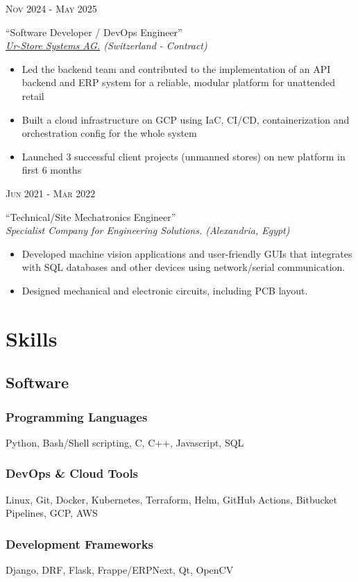 \documentclass[a4paper]{article}
\newcommand{\entry}[4]{   %
	\begin{center}
		\begin{minipage}[c]{0.2\linewidth}  %
			\vfill
			\hfill  %
			\textsc{#1}  %
			\vfill
		\end{minipage}
		\hfill\vline\hfill  %
		\begin{minipage}[c]{0.75\linewidth}
			\textrm{``#2''} \\
			\textit{#3} \\
			\footnotesize{#4}
		\end{minipage}
	\end{center}
}
\newcommand{\blist}[1]{  %
    \vspace{-\topsep}
    \renewcommand\labelitemi{\tiny$\bullet$}
    \begin{itemize}[leftmargin=3.5mm, noitemsep]
        #1
    \end{itemize}
}
\begin{document}
        \entry{Nov 2024 - May 2025}
            {Software Developer / DevOps Engineer}
            {\href{https://ur-store.ch/}{Ur-Store Systems AG.} (Switzerland - Contract)}
            {
                \blist{
                    \item Led the backend team and contributed to the implementation of an API backend and ERP system for a reliable,
                        modular platform for unattended retail
                    \item Built a cloud infrastructure on GCP using IaC, CI/CD, containerization and orchestration config for the whole system
                    \item Launched 3 successful client projects (unmanned stores) on new platform in first 6 months
                }
            }
        \entry{Jun 2021 - Mar 2022}
            {Technical/Site Mechatronics Engineer}
            {Specialist Company for Engineering Solutions. (Alexandria, Egypt)}
            {
                \blist{
                    \item Developed machine vision applications and user-friendly GUIs 
                        that integrates with SQL databases and other devices using network/serial communication.
                    \item Designed mechanical and electronic circuits, including PCB layout.
                }
            }

	\section{Skills}
        \subsection{Software}
			\subsubsection{Programming Languages}
			Python, Bash/Shell scripting, C, C++, Javascript, SQL
            \subsubsection{DevOps \& Cloud Tools}
            Linux, Git, Docker, Kubernetes, Terraform, Helm, GitHub Actions, Bitbucket Pipelines, GCP, AWS
            \subsubsection{Development Frameworks}
            Django, DRF, Flask, Frappe/ERPNext, Qt, OpenCV
\end{document}
